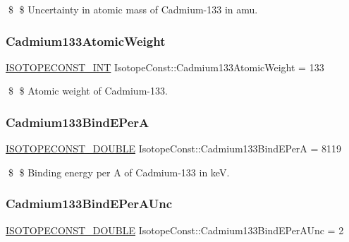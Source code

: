 \$ \$ Uncertainty in atomic mass of Cadmium-\/133 in amu. \mbox{\label{group___isotope_const-_cadmium-_cd133_ga20dffeca6f205950e5bb6ac5de993aee}} 
\subsubsection{\texorpdfstring{Cadmium133\+Atomic\+Weight}{Cadmium133AtomicWeight}}
{\footnotesize\ttfamily \mbox{\hyperlink{group___isotope_const-_macros_ga5f18360b3e99483a35c32d789e62621c}{I\+S\+O\+T\+O\+P\+E\+C\+O\+N\+S\+T\+\_\+\+I\+NT}} Isotope\+Const\+::\+Cadmium133\+Atomic\+Weight = 133}

\$ \$ Atomic weight of Cadmium-\/133. \mbox{\label{group___isotope_const-_cadmium-_cd133_gacd425d1cac416084d40f4ea83166d4f8}} 
\subsubsection{\texorpdfstring{Cadmium133\+Bind\+E\+PerA}{Cadmium133BindEPerA}}
{\footnotesize\ttfamily \mbox{\hyperlink{group___isotope_const-_macros_ga8f45a7272ce02c0b4c65c44636ed719a}{I\+S\+O\+T\+O\+P\+E\+C\+O\+N\+S\+T\+\_\+\+D\+O\+U\+B\+LE}} Isotope\+Const\+::\+Cadmium133\+Bind\+E\+PerA = 8119}

\$ \$ Binding energy per A of Cadmium-\/133 in keV. \mbox{\label{group___isotope_const-_cadmium-_cd133_ga159d4d916c8272333d41608ac99aab9c}} 
\subsubsection{\texorpdfstring{Cadmium133\+Bind\+E\+Per\+A\+Unc}{Cadmium133BindEPerAUnc}}
{\footnotesize\ttfamily \mbox{\hyperlink{group___isotope_const-_macros_ga8f45a7272ce02c0b4c65c44636ed719a}{I\+S\+O\+T\+O\+P\+E\+C\+O\+N\+S\+T\+\_\+\+D\+O\+U\+B\+LE}} Isotope\+Const\+::\+Cadmium133\+Bind\+E\+Per\+A\+Unc = 2}


